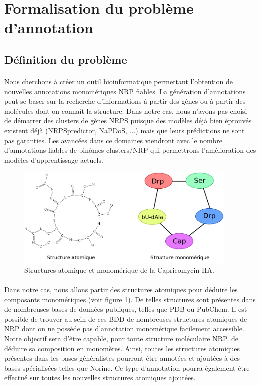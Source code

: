 \documentclass[12pt,french,twoside]{report}
\begin{document}
\section{Formalisation du problème d'annotation}

\subsection{Définition du problème}

\paragraph{}Nous cherchons à créer un outil bioinformatique permettant l'obtention de nouvelles annotations monomériques NRP fiables.
La génération d'annotations peut se baser sur la recherche d'informations à partir des gènes ou à partir des molécules dont on connaît la structure.
Dans notre cas, nous n'avons pas choisi de démarrer des clusters de gènes NRPS puisque des modèles déjà bien éprouvés existent déjà (NRPSpredictor, NaPDoS, ...) mais que leurs prédictions ne sont pas garanties.
Les avancées dans ce domaines viendront avec le nombre d'annotations fiables de binômes clusters/NRP qui permettrons l'amélioration des modèles d'apprentissage actuels.

\begin{figure}[!h]
  \begin{center}
    \includegraphics[width=400px]{Figures/s2m/Intro/structures.png}
    \caption{\label{structures}Structures atomique et monomérique de la Caprieomycin IIA.}
  \end{center}
\end{figure}

\paragraph{}Dans notre cas, nous allons partir des structures atomiques pour déduire les composants monomériques (voir figure \ref{structures}).
De telles structures sont présentes dans de nombreuses bases de données publiques, telles que PDB ou PubChem.
Il est possible de trouver au sein de ces BDD de nombreuses structures atomiques de NRP dont on ne possède pas d'annotation monomérique facilement accessible.
Notre objectif sera d'être capable, pour toute structure moléculaire NRP, de déduire sa composition en monomères.
Ainsi, toutes les structures atomiques présentes dans les bases généralistes pourront être annotées et ajoutées à des bases spécialisées telles que Norine.
Ce type d'annotation pourra également être effectué sur toutes les nouvelles structures atomiques ajoutées.
\end{document}
